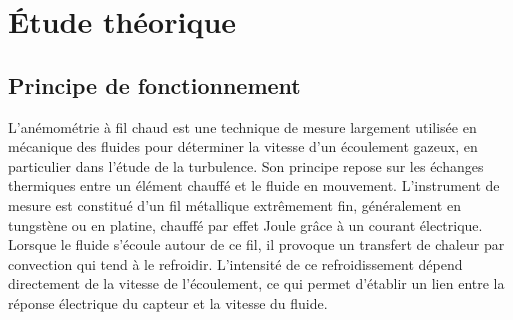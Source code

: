 \documentclass[12pt, a4paper]{report}
\begin{document}
	\begin{table}[h!]	
		\centering
		\caption{Comparaison des méthodes d'anémométrie à fil chaud}
		\label{tab:Comp_meth_anemo}
	\end{table}

	
	\chapter{Étude théorique}
	\section{Principe de fonctionnement}
	L'anémométrie à fil chaud est une technique de mesure largement utilisée en mécanique des fluides pour déterminer la vitesse d'un écoulement gazeux, en particulier dans l'étude de la turbulence. Son principe repose sur les échanges thermiques entre un élément chauffé et le fluide en mouvement. L'instrument de mesure est constitué d'un fil métallique extrêmement fin, généralement en tungstène ou en platine, chauffé par effet Joule grâce à un courant électrique. Lorsque le fluide s'écoule autour de ce fil, il provoque un transfert de chaleur par convection qui tend à le refroidir. L'intensité de ce refroidissement dépend directement de la vitesse de l'écoulement, ce qui permet d'établir un lien entre la réponse électrique du capteur et la vitesse du fluide.\\
	
\end{document}
